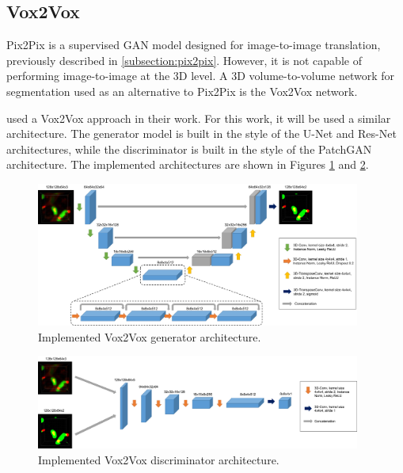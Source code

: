\subsection{Vox2Vox}

Pix2Pix is a supervised GAN model designed for image-to-image translation, previously described in \ref{subsection:pix2pix}. However, it is not capable of performing image-to-image  at the 3D level. A 3D volume-to-volume network for segmentation used as an alternative to Pix2Pix is the Vox2Vox network.

\citet{vox2vox} used a Vox2Vox approach in their work. For this work, it will be used a similar architecture. The generator model is built in the style of the U-Net and Res-Net \cite{2015deep} architectures, while the discriminator is built in the style of the PatchGAN \cite{isola2018imagetoimage}  architecture. The implemented architectures are shown in Figures \ref{fig:genvox} and \ref{fig:discvox}.

\begin{figure}[!htb]
  \centering
  \includegraphics[width=0.95\textwidth]{Images/Picture2.jpg}
  \caption[Implemented Vox2Vox generator architecture.]{Implemented Vox2Vox generator architecture.}
  \label{fig:genvox}
\end{figure}

\begin{figure}[!htb]
  \centering
  \includegraphics[width=0.95\textwidth]{Images/discriminator_vox.jpg}
  \caption[Implemented Vox2Vox discriminator architecture.]{Implemented Vox2Vox discriminator architecture.}
  \label{fig:discvox}
\end{figure}

